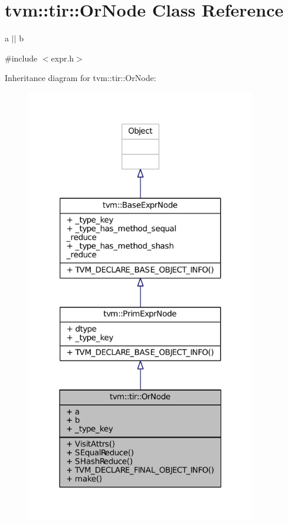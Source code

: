 \hypertarget{classtvm_1_1tir_1_1OrNode}{}\section{tvm\+:\+:tir\+:\+:Or\+Node Class Reference}
\label{classtvm_1_1tir_1_1OrNode}


a $\vert$$\vert$ b  




{\ttfamily \#include $<$expr.\+h$>$}



Inheritance diagram for tvm\+:\+:tir\+:\+:Or\+Node\+:
\nopagebreak
\begin{figure}[H]
\begin{center}
\leavevmode
\includegraphics[width=285pt]{classtvm_1_1tir_1_1OrNode__inherit__graph}
\end{center}
\end{figure}


